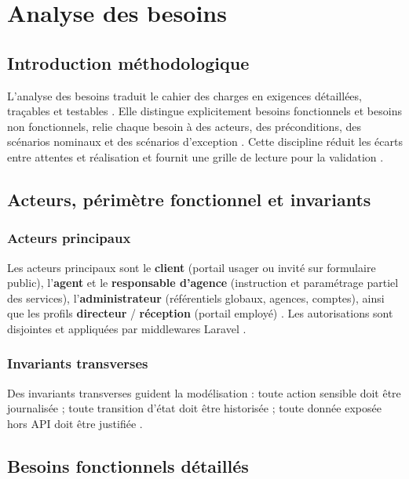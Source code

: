 \chapter{Analyse des besoins}
\label{chap:besoins}

\section{Introduction méthodologique}

L'analyse des besoins traduit le cahier des charges en exigences détaillées, traçables et testables \cite{sommerville2016,ieee1012}. Elle distingue explicitement besoins fonctionnels et besoins non fonctionnels, relie chaque besoin à des acteurs, des préconditions, des scénarios nominaux et des scénarios d'exception \cite{pressman2014}. Cette discipline réduit les écarts entre attentes et réalisation et fournit une grille de lecture pour la validation \cite{iso25010}.

\section{Acteurs, périmètre fonctionnel et invariants}

\subsection{Acteurs principaux}

Les acteurs principaux sont le \textbf{client} (portail usager ou invité sur formulaire public), l'\textbf{agent} et le \textbf{responsable d'agence} (instruction et paramétrage partiel des services), l'\textbf{administrateur} (référentiels globaux, agences, comptes), ainsi que les profils \textbf{directeur} / \textbf{réception} (portail employé) \cite{booch2005}. Les autorisations sont disjointes et appliquées par middlewares Laravel \cite{owasp2021}.

\subsection{Invariants transverses}

Des invariants transverses guident la modélisation : toute action sensible doit être journalisée ; toute transition d'état doit être historisée ; toute donnée exposée hors API doit être justifiée \cite{kleppmann2017,iso25010}.

\newpage
\section{Besoins fonctionnels détaillés}

